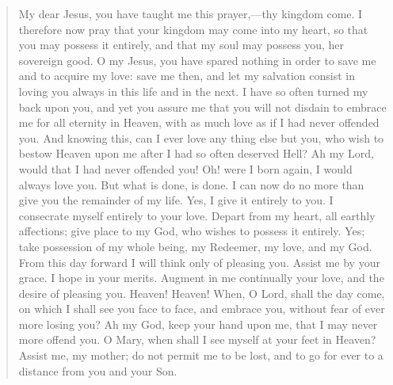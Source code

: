 \begin{quote}
My dear Jesus, you have taught me this prayer,---thy kingdom come. I therefore now pray that your kingdom may come into my heart, so that you may possess it entirely, and that my soul may possess you, her sovereign good. O my Jesus, you have spared nothing in order to save me and to acquire my love: save me then, and let my salvation consist in loving you always in this life and in the next. I have so often turned my back upon you, and yet you assure me that you will not disdain to embrace me for all eternity in Heaven, with as much love as if I had never offended you. And knowing this, can I ever love any thing else but you, who wish to bestow Heaven upon me after I had so often deserved Hell? Ah my Lord, would that I had never offended you! Oh! were I born again, I would always love you. But what is done, is done. I can now do no more than give you the remainder of my life. Yes, I give it entirely to you. I consecrate myself entirely to your love. Depart from my heart, all earthly affections; give place to my God, who wishes to possess it entirely. Yes; take possession of my whole being, my Redeemer, my love, and my God. From this day forward I will think only of pleasing you. Assist me by your grace. I hope in your merits. Augment in me continually your love, and the desire of pleasing you. Heaven! Heaven! When, O Lord, shall the day come, on which I shall see you face to face, and embrace you, without fear of ever more losing you? Ah my God, keep your hand upon me, that I may never more offend you. O Mary, when shall I see myself at your feet in Heaven? Assist me, my mother; do not permit me to be lost, and to go for ever to a distance from you and your Son.
\end{quote}
